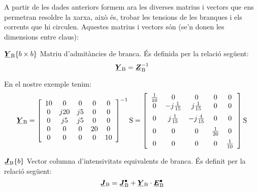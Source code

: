 A partir de les dades anteriors formem ara les diverses matrius i
vectors que ens permetran resoldre la xarxa, això és, trobar les
tensions de les branques i els corrents que hi circulen. Aquestes
matrius i vectors són (se'n donen les dimensions entre claus):

\begin{list}{}
{\setlength{\labelwidth}{20mm} \setlength{\leftmargin}{22mm} \setlength{\labelsep}{2mm}}
   \item[$\mcmplx{Y}\ped{B}\{b\times b\}$] Matriu d'admitàncies de branca. És definida per la relació següent:
   \begin{equation}
      \mcmplx{Y}\ped{B} = \mcmplx{Z}\ped{B}^{-1}
   \end{equation}

   En el nostre exemple tenim:
   \[
      \mcmplx{Y}\ped{B} = 
      \begin{bmatrix}\begin{array}{ccccc} 
            10 & 0 & 0 & 0 & 0 \\
            0 & j 20 & j 5 & 0 & 0 \\
            0 & j 5 & j 5 & 0 & 0 \\
            0 & 0 & 0 & 20 & 0 \\
            0 & 0 & 0 & 0 & 10
      \end{array}\end{bmatrix}^{-1}\unit{S} =
      \begin{bmatrix}\begin{array}{ccccc} 
            \frac{1}{10} & 0 & 0 & 0 & 0 \\
            0 & -j\frac{1}{15} & j\frac{1}{15} & 0 & 0 \\[2mm]
            0 & j\frac{1}{15} & -j\frac{4}{15} & 0 & 0 \\[2mm]
            0 & 0 & 0 & \frac{1}{20} & 0 \\[2mm]
            0 & 0 & 0 & 0 & \frac{1}{10}
      \end{array}\end{bmatrix}\unit{S}
   \]

   \item[$\mcmplx{J}\ped{B}\{b\}$] Vector columna d'intensivitats  equivalents de branca. És definit per la relació següent:
   \begin{equation}
      \mcmplx{J}\ped{B} = \mcmplx{J}\ped{B}^\bullet  + \mcmplx{Y}\ped{B} \cdot\mcmplx{E}\ped{B}^\bullet
   \end{equation}


\end{list}
